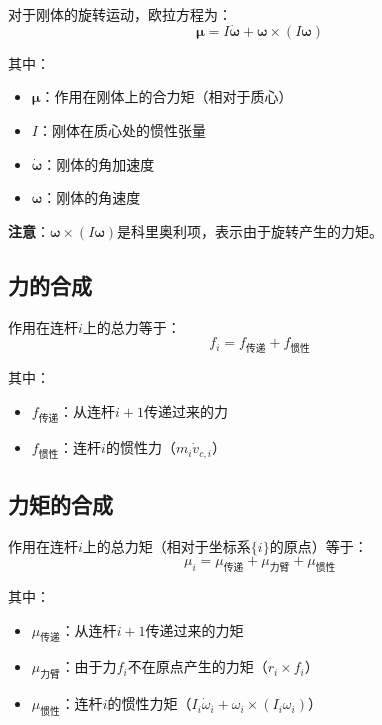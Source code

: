 \documentclass[12pt,a4paper]{article}
\begin{document}
对于刚体的旋转运动，欧拉方程为：
\begin{equation}
\boldsymbol{\mu} = I \dot{\boldsymbol{\omega}} + \boldsymbol{\omega} \times (I \boldsymbol{\omega})
\end{equation}

其中：
\begin{itemize}
\item $\boldsymbol{\mu}$：作用在刚体上的合力矩（相对于质心）
\item $I$：刚体在质心处的惯性张量
\item $\dot{\boldsymbol{\omega}}$：刚体的角加速度
\item $\boldsymbol{\omega}$：刚体的角速度
\end{itemize}

\textbf{注意}：$\boldsymbol{\omega} \times (I \boldsymbol{\omega})$是科里奥利项，表示由于旋转产生的力矩。

\subsection{力的合成}

作用在连杆$i$上的总力等于：
\begin{equation}
f_i = f_{\text{传递}} + f_{\text{惯性}}
\end{equation}

其中：
\begin{itemize}
\item $f_{\text{传递}}$：从连杆$i+1$传递过来的力
\item $f_{\text{惯性}}$：连杆$i$的惯性力（$m_i \dot{v}_{c,i}$）
\end{itemize}

\subsection{力矩的合成}

作用在连杆$i$上的总力矩（相对于坐标系$\{i\}$的原点）等于：
\begin{equation}
\mu_i = \mu_{\text{传递}} + \mu_{\text{力臂}} + \mu_{\text{惯性}}
\end{equation}

其中：
\begin{itemize}
\item $\mu_{\text{传递}}$：从连杆$i+1$传递过来的力矩
\item $\mu_{\text{力臂}}$：由于力$f_i$不在原点产生的力矩（$r_i \times f_i$）
\item $\mu_{\text{惯性}}$：连杆$i$的惯性力矩（$I_i \dot{\omega}_i + \omega_i \times (I_i \omega_i)$）
\end{itemize}
\end{document}
